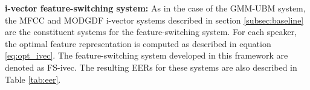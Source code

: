 \documentclass{article}
\begin{document}
\textbf{i-vector feature-switching system:}
As in the case of the GMM-UBM system, the MFCC and MODGDF i-vector systems
described in section \ref{subsec:baseline} are the constituent systems for the
feature-switching system. For each speaker, the optimal feature representation
is computed as described in equation \ref{eq:opt_ivec}.
The feature-switching system developed in this
framework are denoted as FS-ivec. 
The resulting EERs for 
these systems are also described in Table \ref{tab:eer}.
\end{document}
